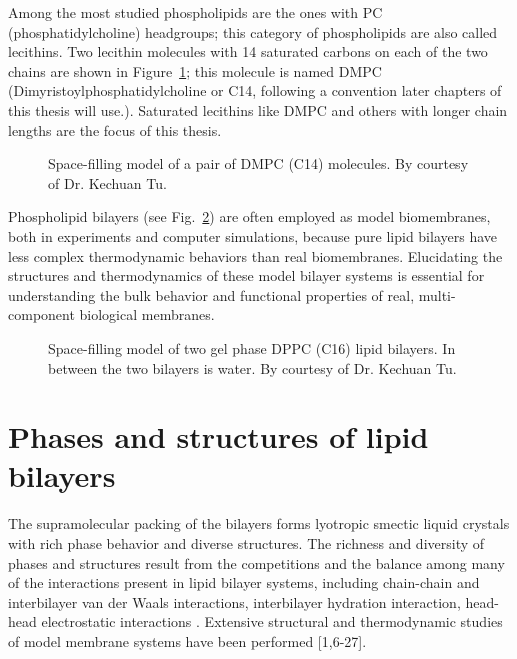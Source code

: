 Among the most studied phospholipids are the ones with PC (phosphatidylcholine)
headgroups; this category of phospholipids are also called lecithins. Two
lecithin molecules with 14 saturated carbons on each of the 
two chains are shown in Figure~\ref{intro:dmpc}; this molecule is named DMPC 
(Dimyristoylphosphatidylcholine or C14, following a convention later chapters 
of this thesis will use.). 
Saturated lecithins like DMPC and others with longer chain lengths 
are the focus of this thesis.

\begin{figure}[h]
\label{intro:dmpc}
\centerline {}
\caption{Space-filling model of a pair of DMPC (C14) molecules.
By courtesy of Dr. Kechuan Tu.}
\end{figure}

Phospholipid bilayers (see Fig.~\ref{intro_bilayer}) are often employed as 
model biomembranes, both in experiments and computer simulations,
because pure lipid bilayers have less complex thermodynamic behaviors
than real biomembranes. Elucidating the structures and thermodynamics
of these model bilayer systems is essential for understanding the bulk 
behavior and functional properties of real, multi-component biological
membranes.

\begin{figure}
\label{intro_bilayer}
\centerline {}
\caption{Space-filling model of two gel phase DPPC (C16) lipid bilayers.
In between the two bilayers is water.
By courtesy of Dr. Kechuan Tu.}
\end{figure}

\section{Phases and structures of lipid bilayers}
\label{intro_chap_phas}

The supramolecular packing of the bilayers forms lyotropic smectic
liquid crystals with rich phase behavior and diverse structures. The 
richness and diversity of phases and structures result from the 
competitions and the balance among many of the interactions present in 
lipid bilayer systems, including chain-chain and interbilayer van der 
Waals interactions, interbilayer hydration interaction, head-head 
electrostatic interactions \cite{Isr85}. Extensive structural and 
thermodynamic studies of model membrane systems have been performed [1,6-27].

